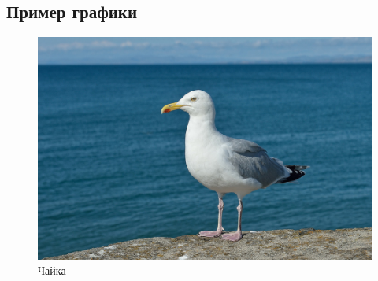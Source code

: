 \documentclass[12pt, letterpaper]{article}
\begin{document}
\subsection{Пример графики}
\begin{figure}[H]
\includegraphics{gull}
\centering
\caption{Чайка}
\end{figure}
\end{document}
